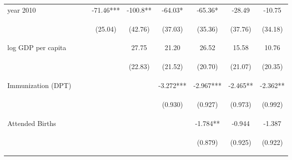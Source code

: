\begin{landscape}
\begin{subtables}
\begin{table}[htpb!]
\begin{center}
\begin{tabular}{lcccccccc}
year 2010&&&-71.46***&-100.8**&-64.03*&-65.36*&-28.49&-10.75\\
&&&\begin{footnotesize}(25.04)\end{footnotesize}&\begin{footnotesize}(42.76)\end{footnotesize}&\begin{footnotesize}(37.03)\end{footnotesize}&\begin{footnotesize}(35.36)\end{footnotesize}&\begin{footnotesize}(37.76)\end{footnotesize}&\begin{footnotesize}(34.18)\end{footnotesize}\\
log GDP per capita&&&&27.75&21.20&26.52&15.58&10.76\\
&&&&\begin{footnotesize}(22.83)\end{footnotesize}&\begin{footnotesize}(21.52)\end{footnotesize}&\begin{footnotesize}(20.70)\end{footnotesize}&\begin{footnotesize}(21.07)\end{footnotesize}&\begin{footnotesize}(20.35)\end{footnotesize}\\
Immunization (DPT) &&&&&-3.272***&-2.967***&-2.465**&-2.362**\\
&&&&&\begin{footnotesize}(0.930)\end{footnotesize}&\begin{footnotesize}(0.927)\end{footnotesize}&\begin{footnotesize}(0.973)\end{footnotesize}&\begin{footnotesize}(0.992)\end{footnotesize}\\
Attended Births&&&&&&-1.784**&-0.944&-1.387\\
&&&&&&\begin{footnotesize}(0.879)\end{footnotesize}&\begin{footnotesize}(0.925)\end{footnotesize}&\begin{footnotesize}(0.922)\end{footnotesize}\\

\end{tabular}
\end{center}
\end{table}
\end{subtables}
\end{landscape}

